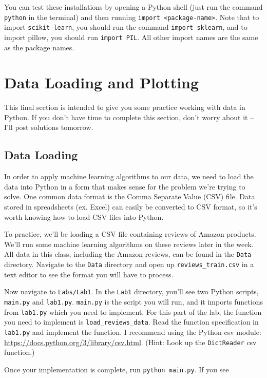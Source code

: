 \documentclass{article}
\begin{document}
You can test these installations by opening a Python shell (just run the command \texttt{python} in the terminal) and then running \texttt{import <package-name>}. Note that to import \texttt{scikit-learn}, you should run the command \texttt{import sklearn}, and to import pillow, you should run \texttt{import PIL}. All other import names are the same as the package names.

\section{Data Loading and Plotting}

This final section is intended to give you some practice working with data in Python. If you don't have time to complete this section, don't worry about it -- I'll post solutions tomorrow.

\subsection{Data Loading}

In order to apply machine learning algorithms to our data, we need to load the data into Python in a form that makes sense for the problem we're trying to solve. One common data format is the Comma Separate Value (CSV) file. Data stored in spreadsheets (ex. Excel) can easily be converted to CSV format, so it's worth knowing how to load CSV files into Python.

To practice, we'll be loading a CSV file containing reviews of Amazon products. We'll run some machine learning algorithms on these reviews later in the week. All data in this class, including the Amazon reviews, can be found in the \texttt{Data} directory. Navigate to the \texttt{Data} directory and open up \texttt{reviews\_train.csv} in a text editor to see the format you will have to process.

Now navigate to \texttt{Labs/Lab1}. In the \texttt{Lab1} directory, you'll see two Python scripts, \texttt{main.py} and \texttt{lab1.py}. \texttt{main.py} is the script you will run, and it imports functions from \texttt{lab1.py} which you need to implement. For this part of the lab, the function you need to implement is \texttt{load\_reviews\_data}. Read the function specification in \texttt{lab1.py} and implement the function. I recommend using the Python csv module: \url{https://docs.python.org/3/library/csv.html}. (Hint: Look up the \texttt{DictReader} csv function.)

Once your implementation is complete, run \texttt{python main.py}. If you see
\end{document}
